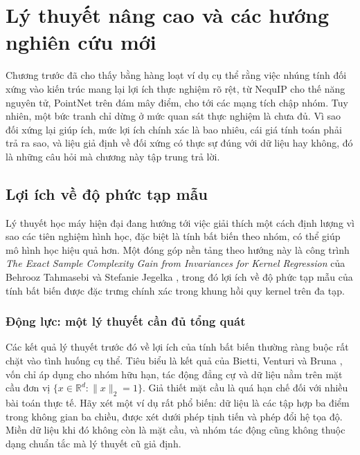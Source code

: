 % 
\section{Lý thuyết nâng cao và các hướng nghiên cứu mới}
\label{sec:ly-thuyet-nang-cao}

Chương trước đã cho thấy bằng hàng loạt ví dụ cụ thể rằng việc nhúng tính đối xứng vào kiến trúc mang lại lợi ích thực nghiệm rõ rệt, từ NequIP cho thế năng nguyên tử, PointNet trên đám mây điểm, cho tới các mạng tích chập nhóm. Tuy nhiên, một bức tranh chỉ dừng ở mức quan sát thực nghiệm là chưa đủ. Vì sao đối xứng lại giúp ích, mức lợi ích chính xác là bao nhiêu, cái giá tính toán phải trả ra sao, và liệu giả định về đối xứng có thực sự đúng với dữ liệu hay không, đó là những câu hỏi mà chương này tập trung trả lời.



\subsection{Lợi ích về độ phức tạp mẫu}
\label{subsec:sample-complexity}
 
Lý thuyết học máy hiện đại đang hướng tới việc giải thích một cách định lượng vì sao các tiên nghiệm hình học, đặc biệt là tính bất biến theo nhóm, có thể giúp mô hình học hiệu quả hơn. Một đóng góp nền tảng theo hướng này là công trình \textit{The Exact Sample Complexity Gain from Invariances for Kernel Regression} của Behrooz Tahmasebi và Stefanie Jegelka \cite{tahmasebi2023exact}, trong đó lợi ích về độ phức tạp mẫu của tính bất biến được đặc trưng chính xác trong khung hồi quy kernel trên đa tạp.
 
\subsubsection{Động lực: một lý thuyết cần đủ tổng quát}
 
Các kết quả lý thuyết trước đó về lợi ích của tính bất biến thường ràng buộc rất chặt vào tình huống cụ thể. Tiêu biểu là kết quả của Bietti, Venturi và Bruna \cite{bietti2021sample}, vốn chỉ áp dụng cho nhóm hữu hạn, tác động đẳng cự và dữ liệu nằm trên mặt cầu đơn vị $\{x \in \mathbb{R}^d : \|x\|_2 = 1\}$. Giả thiết mặt cầu là quá hạn chế đối với nhiều bài toán thực tế. Hãy xét một ví dụ rất phổ biến: dữ liệu là các tập hợp ba điểm trong không gian ba chiều, được xét dưới phép tịnh tiến và phép đổi hệ tọa độ. Miền dữ liệu khi đó không còn là mặt cầu, và nhóm tác động cũng không thuộc dạng chuẩn tắc mà lý thuyết cũ giả định.
 
